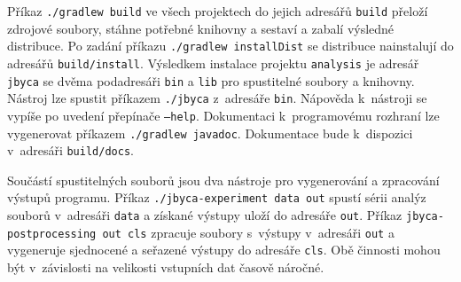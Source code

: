Příkaz \texttt{./gradlew build} ve všech projektech do jejich adresářů \texttt{build} přeloží zdrojové soubory, stáhne potřebné knihovny a sestaví a zabalí výsledné distribuce. Po zadání příkazu \texttt{./gradlew installDist} se distribuce nainstalují do adresářů \texttt{build/install}. Výsledkem instalace projektu \texttt{analysis} je adresář \texttt{jbyca} se dvěma podadresáři \texttt{bin} a \texttt{lib} pro spustitelné soubory a knihovny. Nástroj lze spustit příkazem \texttt{./jbyca} z~adresáře \texttt{bin}. Nápověda k~nástroji se vypíše po uvedení přepínače \texttt{---help}. Dokumentaci k~programovému rozhraní lze vygenerovat příkazem \texttt{./gradlew javadoc}. Dokumentace bude k~dispozici v~adresáři \texttt{build/docs}.

Součástí spustitelných souborů jsou dva nástroje pro vygenerování a zpracování výstupů programu. Příkaz \texttt{./jbyca-experiment data out} spustí sérii analýz souborů v~adresáři \texttt{data} a získané výstupy uloží do adresáře \texttt{out}. Příkaz \texttt{jbyca-postprocessing out cls} zpracuje soubory s~výstupy v~adresáři \texttt{out} a vygeneruje sjednocené a seřazené výstupy do adresáře \texttt{cls}. Obě činnosti mohou být v~závislosti na velikosti vstupních dat časově náročné.







